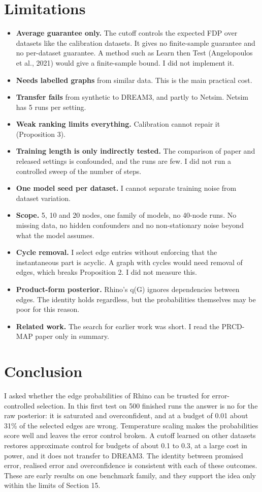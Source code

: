 \documentclass[10pt]{article}
\begin{document}
\section{Limitations}
\begin{itemize}
\item \textbf{Average guarantee only.} The cutoff controls the expected FDP over datasets like the calibration datasets. It gives no finite-sample guarantee and no per-dataset guarantee. A method such as Learn then Test (Angelopoulos et al., 2021) would give a finite-sample bound. I did not implement it.
\item \textbf{Needs labelled graphs} from similar data. This is the main practical cost.
\item \textbf{Transfer fails} from synthetic to DREAM3, and partly to Netsim. Netsim has 5 runs per setting.
\item \textbf{Weak ranking limits everything.} Calibration cannot repair it (Proposition 3).
\item \textbf{Training length is only indirectly tested.} The comparison of paper and released settings is confounded, and the runs are few. I did not run a controlled sweep of the number of steps.
\item \textbf{One model seed per dataset.} I cannot separate training noise from dataset variation.
\item \textbf{Scope.} 5, 10 and 20 nodes, one family of models, no 40-node runs. No missing data, no hidden confounders and no non-stationary noise beyond what the model assumes.
\item \textbf{Cycle removal.} I select edge entries without enforcing that the instantaneous part is acyclic. A graph with cycles would need removal of edges, which breaks Proposition 2. I did not measure this.
\item \textbf{Product-form posterior.} Rhino's q(G) ignores dependencies between edges. The identity holds regardless, but the probabilities themselves may be poor for this reason.
\item \textbf{Related work.} The search for earlier work was short. I read the PRCD-MAP paper only in summary.
\end{itemize}
\section{Conclusion}
I asked whether the edge probabilities of Rhino can be trusted for error-controlled selection. In this first test on 500 finished runs the answer is no for the raw posterior: it is saturated and overconfident, and at a budget of 0.01 about 31\% of the selected edges are wrong. Temperature scaling makes the probabilities score well and leaves the error control broken. A cutoff learned on other datasets restores approximate control for budgets of about 0.1 to 0.3, at a large cost in power, and it does not transfer to DREAM3. The identity between promised error, realised error and overconfidence is consistent with each of these outcomes. These are early results on one benchmark family, and they support the idea only within the limits of Section 15.
\end{document}
